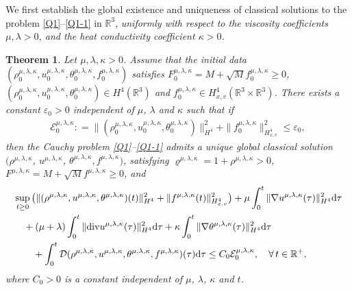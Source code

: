 \documentclass[reqno,11pt]{amsart}
\theoremstyle{plain}
\newtheorem{thm}{Theorem}[section]
\numberwithin{equation}{section}
\begin{document}
We first establish the global existence and uniqueness of classical solutions to 
the problem \eqref{Q1}--\eqref{Q1-1} in $\mathbb{R}^3$, \emph{uniformly with respect to 
 the viscosity coefficients $\mu,\lambda>0$, and
the heat conductivity coefficient $\kappa > 0$.}
\begin{thm}\label{T1.1}
Let %
$\mu,\lambda,\kappa>0$. 
Assume that the initial data  $(\rho_0^{\mu,\lambda,\kappa},u_0^{\mu,\lambda,\kappa},
\theta_0^{\mu,\lambda,\kappa},f_0^{\mu,\lambda,\kappa})$
satisfies $F_0^{\mu,\lambda,\kappa}=M+\sqrt{M}f_0^{\mu,\lambda,\kappa}\geq 0$, 
$(\rho_0^{\mu,\lambda,\kappa},u_0^{\mu,\lambda,\kappa},\theta_0^{\mu,\lambda,\kappa})\in 
H^4(\mathbb{R}^3)$ and $f_0^{\mu,\lambda,\kappa}\in H^4_{x,v}(\mathbb{R}^3\times\mathbb{R}^3)$.
There exists a constant $\varepsilon_0>0$ independent of 
$\mu$, $\lambda$ and $\kappa$ such that if
\begin{align}\label{a-1}
\mathcal{E}_0^{\mu,\lambda,\kappa}:
=\|(\rho^{{\mu,\lambda,\kappa}}_0,u^{{\mu,\lambda,\kappa}}_0,
\theta^{{\mu,\lambda,\kappa}}_0 )\|_{H^4}^2+\|f_0^{\mu,\lambda,\kappa}\|_{H_{x,v}^4}^2\leq \varepsilon_0,
\end{align}
then the Cauchy problem \eqref{Q1}--\eqref{Q1-1} 
admits a unique global classical solution $(\rho^{{\mu,\lambda,\kappa}}$, 
$u^{{\mu,\lambda,\kappa}}$, $\theta^{{\mu,\lambda,\kappa}},f^{{\mu,\lambda,\kappa}})$,  
 satisfying $\varrho^{{\mu,\lambda,\kappa}}=1+\rho^{\mu,\lambda,\kappa}>0$, 
 $F^{\mu,\lambda,\kappa}=M+\sqrt{M}f^{\mu,\lambda,\kappa}\geq 0$, and
\begin{align}\label{a-2}
&\sup_{t\geq 0}\big(\|(\rho^{{\mu,\lambda,\kappa}},u^{{\mu,\lambda,\kappa}},
\theta^{{\mu,\lambda,\kappa}} )(t)\|_{H^{4}}^2+\|f^{\mu,\lambda,\kappa}(t)\|_{H_{x,v}^4}^2\big)
+\mu\int_0^{t}\|\nabla u^{\mu,\lambda,\kappa} (\tau)\|_{H^4}^2{\rm d}\tau  \nonumber\\
& \quad+ (\mu+\lambda) \int_0^{t}\|{\rm div} u^{\mu,\lambda,\kappa} (\tau)\|_{H^4}^2{\rm d}\tau 
 +\kappa\int_0^{t}\|\nabla \theta^{\mu,\lambda,\kappa} (\tau)\|_{H^4}^2{\rm d}\tau  \nonumber\\
  & \quad\quad+\int_{0}^{t} \mathcal{D}(\rho^{\mu,\lambda,\kappa},u^{\mu,\lambda,\kappa},
  \theta^{\mu,\lambda,\kappa},f^{\mu,\lambda,\kappa})(\tau){\rm d}\tau 
   \leq C_0\mathcal{E}_0^{\mu,\lambda,\kappa},
  \quad \forall \, t\in \mathbb{R}^{+},
\end{align}
where $C_0 > 0$ is a constant   independent of $\mu$, $\lambda$,  $\kappa$ and   $t$.
\end{thm}
\end{document}
